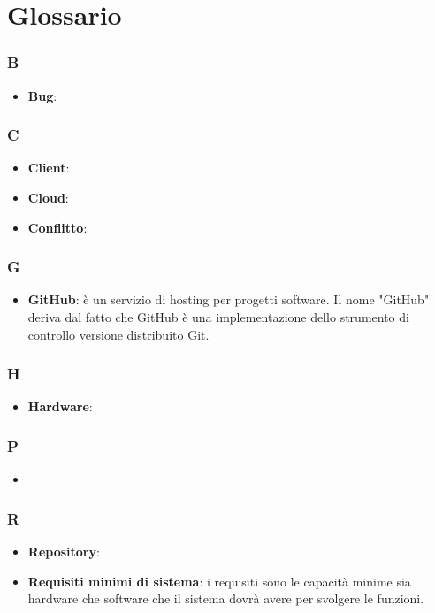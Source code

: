 \appendix

\section{Glossario}
\subsubsection{B}
\begin{itemize}
	\item \textbf{Bug}:
\end{itemize}

\subsubsection{C}
\begin{itemize}
	\item \textbf{Client}:
	\item \textbf{Cloud}:
	\item \textbf{Conflitto}:
\end{itemize}
\subsubsection{G}
\begin{itemize}
	\item \textbf{GitHub}: è un servizio di hosting per progetti software. Il nome "GitHub" deriva dal fatto che
GitHub è una implementazione dello strumento di controllo versione distribuito Git.
\end{itemize}
\subsubsection{H}
\begin{itemize}
	\item \textbf{Hardware}:
\end{itemize}

\subsubsection{P}
\begin{itemize}
	\item 
\end{itemize}

\subsubsection{R}
\begin{itemize}
	\item \textbf{Repository}:
	\item \textbf{Requisiti minimi di sistema}: i requisiti sono le capacità minime sia hardware che software che il sistema dovrà avere per svolgere le funzioni.
\end{itemize}

